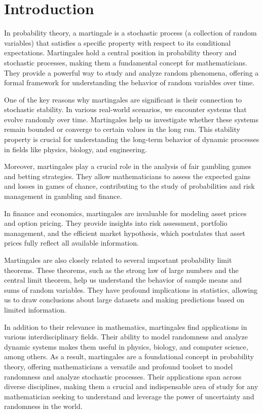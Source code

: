 
\chapter{Introduction}\label{chapter:introduction}

In probability theory, a martingale is a stochastic process (a collection of random variables) that satisfies a specific property with respect to its conditional expectations. Martingales hold a central position in probability theory and stochastic processes, making them a fundamental concept for mathematicians. They provide a powerful way to study and analyze random phenomena, offering a formal framework for understanding the behavior of random variables over time.

One of the key reasons why martingales are significant is their connection to stochastic stability. In various real-world scenarios, we encounter systems that evolve randomly over time. Martingales help us investigate whether these systems remain bounded or converge to certain values in the long run. This stability property is crucial for understanding the long-term behavior of dynamic processes in fields like physics, biology, and engineering.

Moreover, martingales play a crucial role in the analysis of fair gambling games and betting strategies. They allow mathematicians to assess the expected gains and losses in games of chance, contributing to the study of probabilities and risk management in gambling and finance.

In finance and economics, martingales are invaluable for modeling asset prices and option pricing. They provide insights into risk assessment, portfolio management, and the efficient market hypothesis, which postulates that asset prices fully reflect all available information.

Martingales are also closely related to several important probability limit theorems. These theorems, such as the strong law of large numbers and the central limit theorem, help us understand the behavior of sample means and sums of random variables. They have profound implications in statistics, allowing us to draw conclusions about large datasets and making predictions based on limited information.

In addition to their relevance in mathematics, martingales find applications in various interdisciplinary fields. Their ability to model randomness and analyze dynamic systems makes them useful in physics, biology, and computer science, among others. As a result, martingales are a foundational concept in probability theory, offering mathematicians a versatile and profound toolset to model randomness and analyze stochastic processes. Their applications span across diverse disciplines, making them a crucial and indispensable area of study for any mathematician seeking to understand and leverage the power of uncertainty and randomness in the world.

